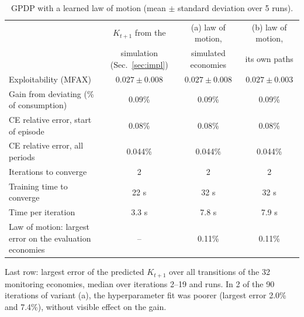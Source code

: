 \documentclass[11pt,a4paper]{article}
\begin{document}
\begin{table}[h]
\centering
\small
\caption{GPDP with a learned law of motion (mean $\pm$ standard deviation over 5 runs).}
\label{tab:lom}
\begin{tabularx}{\linewidth}{@{}>{\raggedright\arraybackslash}Xccc@{}}
\toprule
 & $K_{t+1}$ from the & (a) law of motion, & (b) law of motion, \\
 & simulation (Sec.~\ref{sec:impl}) & simulated economies & its own paths \\
\midrule
Exploitability (MFAX)                   & $0.027 \pm 0.008$ & $0.027 \pm 0.008$ & $0.027 \pm 0.003$ \\
Gain from deviating (\% of consumption) & 0.09\%  & 0.09\%  & 0.09\% \\
CE relative error, start of episode     & 0.08\%  & 0.08\%  & 0.08\% \\
CE relative error, all periods          & 0.044\% & 0.044\% & 0.044\% \\
Iterations to converge                  & 2       & 2       & 2 \\
Training time to converge               & 22 s    & 32 s    & 32 s \\
Time per iteration                      & 3.3 s   & 7.8 s   & 7.9 s \\
Law of motion: largest error on the evaluation economies & -- & 0.11\% & 0.11\% \\
\bottomrule
\end{tabularx}

\smallskip
\begin{minipage}{0.92\linewidth}\footnotesize
Last row: largest error of the predicted $K_{t+1}$ over all transitions of the 32 monitoring
economies, median over iterations 2--19 and runs. In 2 of the 90 iterations of variant (a), the
hyperparameter fit was poorer (largest error 2.0\% and 7.4\%), without visible effect on the gain.
\end{minipage}
\end{table}
\end{document}

